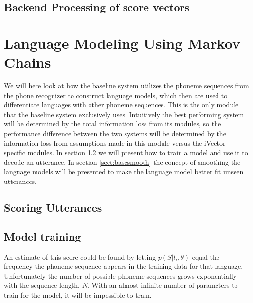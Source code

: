 \subsection{Backend Processing of score vectors}
\label{sect:backendscoring}

\section{Language Modeling Using Markov Chains}

We will here look at how the baseline system utilizes the phoneme sequences from the phone recognizer to construct language models, which then are used to differentiate languages with other phoneme sequences. This is the only module that the baseline system exclusively uses. Intuitively the best performing system will be determined by the total information loss from its modules, so the performance difference between the two systems will be determined by the information loss from assumptions made in this module versus the iVector specific modules. In section \ref{sect:basetrain} we will present how to train a model and use it to decode an utterance. In section \ref{sect:basesmooth} the concept of smoothing the language models will be presented to make the language model better fit unseen utterances.

\subsection{Scoring Utterances}
\label{sect:basescore}

\subsection{Model training}
\label{sect:basetrain}

An estimate of this score could be found by letting $p(S|l_i, \theta)$ equal the frequency the phoneme sequence appears in the training data for that language. Unfortunately the number of possible phoneme sequences grows exponentially with the sequence length, $N$. With an almost infinite number of parameters to train for the model, it will be impossible to train. 

